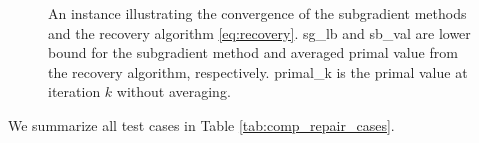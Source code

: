 \documentclass[../main]{subfiles}
\begin{document}
\begin{figure}

  \caption{
    An instance illustrating the convergence of the subgradient methods
    and the recovery algorithm \eqref{eq:recovery}.
    \textsf{sg\_lb} and \textsf{sb\_val}  are lower bound for the subgradient method
    and averaged primal value from the recovery algorithm, respectively.
    \textsf{primal\_k} is the primal value at iteration \(k\) without averaging.
  }

  \label{fig:divergent_volume}
\end{figure}


We summarize all test cases in Table \ref{tab:comp_repair_cases}.
\end{document}
